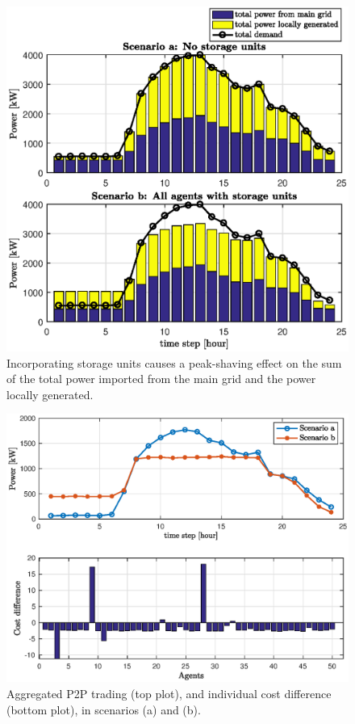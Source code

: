 \documentclass{IEEEtran}  %
\newcommand{\0}{\mathbf{0}}
\newcommand{\1}{\mathbf{1}}
\begin{document}
\begin{figure}[t]
	\centering
	\includegraphics[width=1\linewidth]{figures/simB_0402_pt1_v2}
	\caption{Incorporating storage units causes a peak-shaving effect on the sum of the total power imported from the main grid and the power locally generated.}
	\label{fig:sim_B1}
\end{figure}
\begin{figure}[t]
	\includegraphics[width=1\linewidth]{figures/c2a}
	\caption{Aggregated P2P trading (top plot), and individual cost difference (bottom plot), in scenarios (a) and (b).
	}
	\label{fig:sim_B2}
\end{figure}  
\end{document}
